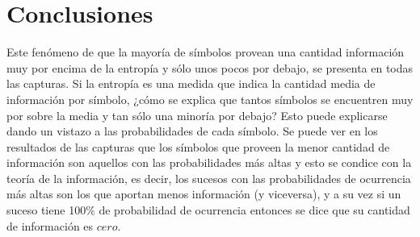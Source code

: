 \section{Conclusiones}

Este fenómeno de que la mayoría de símbolos provean una cantidad información muy por encima de la entropía y sólo unos pocos por debajo, se presenta en todas las capturas. Si la entropía es una medida que indica la cantidad media de información por símbolo, ¿cómo se explica que tantos símbolos se encuentren muy por sobre la media y tan sólo una minoría por debajo? Esto puede explicarse dando un vistazo a las probabilidades de cada símbolo. Se puede ver en los resultados de las capturas que los símbolos que proveen la menor cantidad de información son aquellos con las probabilidades más altas y esto se condice con la teoría de la información, es decir, los sucesos con las probabilidades de ocurrencia más altas son los que aportan menos información (y viceversa), y a su vez si un suceso tiene 100\% de probabilidad de ocurrencia entonces se dice que su cantidad de información es $cero$.